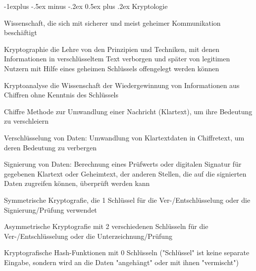 \documentclass[a4paper]{article}
\makeatletter
\renewcommand{\subsection}{\@startsection{subsection}{2}{0mm}%
 {-1explus -.5ex minus -.2ex}%
 {0.5ex plus .2ex}%
 {\normalfont\normalsize\bfseries}}
\makeatother
\begin{document}
\begin{multicols}{3}
      \subsection{Kryptologie}
      \begin{description*}
            \item Wissenschaft, die sich mit sicherer und meist geheimer Kommunikation beschäftigt
            \item[Kryptographie] die Lehre von den Prinzipien und Techniken, mit denen Informationen in verschlüsseltem Text verborgen und später von legitimen Nutzern mit Hilfe eines geheimen Schlüssels offengelegt werden können
            \item[Kryptoanalyse] die Wissenschaft der Wiedergewinnung von Informationen aus Chiffren ohne Kenntnis des Schlüssels
            \item[Chiffre] Methode zur Umwandlung einer Nachricht (Klartext), um ihre Bedeutung zu verschleiern
            \item[Verschlüsselung] von Daten: Umwandlung von Klartextdaten in Chiffretext, um deren Bedeutung zu verbergen
            \item[Signierung] von Daten: Berechnung eines Prüfwerts oder digitalen Signatur für gegebenen Klartext oder Geheimtext, der anderen Stellen, die auf die signierten Daten zugreifen können, überprüft werden kann
            \item[Symmetrische] Kryptografie, die 1 Schlüssel für die Ver-/Entschlüsselung oder die Signierung/Prüfung verwendet
            \item[Asymmetrische] Kryptografie mit 2 verschiedenen Schlüsseln für die Ver-/Entschlüsselung oder die Unterzeichnung/Prüfung
            \item[Kryptografische Hash-Funktionen] mit 0 Schlüsseln ("Schlüssel" ist keine separate Eingabe, sondern wird an die Daten "angehängt" oder mit ihnen "vermischt")
      \end{description*}


\end{multicols}
\end{document}
